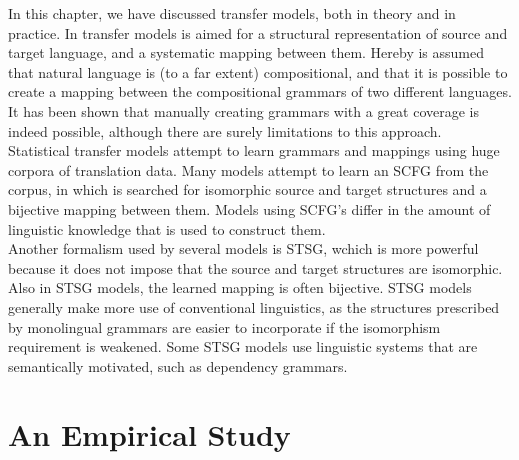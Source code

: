 \documentclass{report}
\theoremstyle{definition}
\theoremstyle{plain}
\begin{document}
In this chapter, we have discussed transfer models, both in theory and in practice. In transfer models is aimed for a structural representation of source and target language, and a systematic mapping between them. Hereby is assumed that natural language is (to a far extent) compositional, and that it is possible to create a mapping between the compositional grammars of two different languages. It has been shown that manually creating grammars with a great coverage is indeed possible, although there are surely limitations to this approach.\\
Statistical transfer models attempt to learn grammars and mappings using huge corpora of translation data. Many models attempt to learn an SCFG from the corpus, in which is searched for isomorphic source and target structures and a bijective mapping between them. Models using SCFG's differ in the amount of linguistic knowledge that is used to construct them. \\
Another formalism used by several models is STSG, wchich is more powerful because it does not impose that the source and target structures are isomorphic. Also in STSG models, the learned mapping is often bijective. STSG models generally make more use of conventional linguistics, as the structures prescribed by monolingual grammars are easier to incorporate if the isomorphism requirement is weakened. Some STSG models use linguistic systems that are semantically motivated, such as dependency grammars.

%
%







%
%

\chapter{An Empirical Study}
\end{document}
